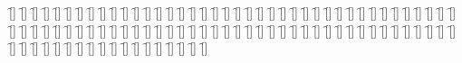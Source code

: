 \begin{questions}
\begin{multicols}{2}
        \question  \f[]
        \question  \f[]
        \question  \f[]
        \question  \f[]
        \question  \f[]
        \question  \f[]
        \question  \f[]
        \question  \f[]
        \question  \f[]
        \question  \f[]
        \question  \f[]
        \question  \f[]
        \question  \f[]
        \question  \f[]
        \question  \f[]
        \question  \f[]
        \question  \f[]
        \question  \f[]
        \question  \f[]
        \question  \f[]
        \question  \f[]
        \question  \f[]
        \question  \f[]
        \question  \f[]
        \question  \f[]
        \question  \f[]
        \question  \f[]
        \question  \f[]
        \question  \f[]
        \question  \f[]
        \question  \f[]
        \question  \f[]
        \question  \f[]
        \question  \f[]
        \question  \f[]
        \question  \f[]
        \question  \f[]
        \question  \f[]
        \question  \f[]
        \question  \f[]
        \question  \f[]
        \question  \f[]
        \question  \f[]
        \question  \f[]
        \question  \f[]
        \question  \f[]
        \question  \f[]
        \question  \f[]
        \question  \f[]
        \question  \f[]
        \question  \f[]
        \question  \f[]
        \question  \f[]
        \question  \f[]
        \question  \f[]
        \question  \f[]
        \question  \f[]
        \question  \f[]
        \question  \f[]
        \question  \f[]
        \question  \f[]
        \question  \f[]
        \question  \f[]
        \question  \f[]
        \question  \f[]
        \question  \f[]
        \question  \f[]
        \question  \f[]
        \question  \f[]
        \question  \f[]
        \question  \f[]
        \question  \f[]
        \question  \f[]
        \question  \f[]
        \question  \f[]
        \question  \f[]
        \question  \f[]
        \question  \f[]
        \question  \f[]
        \question  \f[]
        \question  \f[]
        \question  \f[]
        \question  \f[]
        \question  \f[]
        \question  \f[]
        \question  \f[]
        \question  \f[]
        \question  \f[]
        \question  \f[]
        \question  \f[]
        \question  \f[]
        \question  \f[]
        \question  \f[]
        \question  \f[]
        \question  \f[]
        \question  \f[]
        \question  \f[]
        \question  \f[]
    \end{multicols}
\end{questions}
